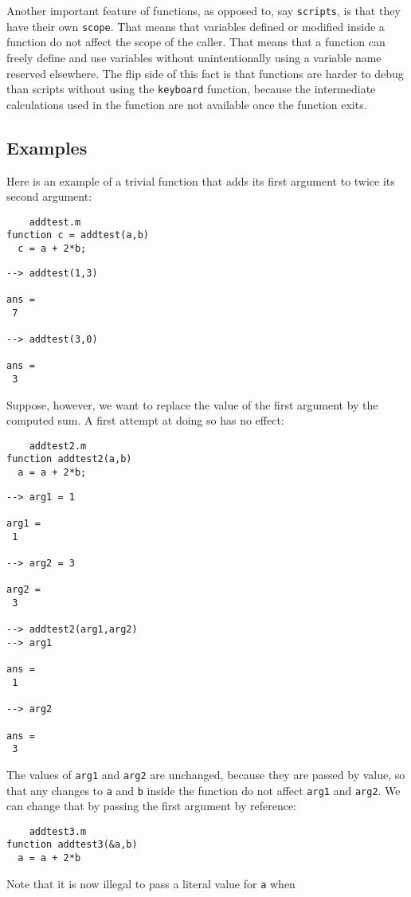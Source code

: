 Another important feature of functions, as opposed to, say \verb|scripts|,
is that they have their own \verb|scope|.  That means that variables
defined or modified inside a function do not affect the scope of the
caller.  That means that a function can freely define and use variables
without unintentionally using a variable name reserved elsewhere.  The
flip side of this fact is that functions are harder to debug than
scripts without using the \verb|keyboard| function, because the intermediate
calculations used in the function are not available once the function
exits.
\subsection{Examples}

Here is an example of a trivial function that adds its
first argument to twice its second argument:
\begin{verbatim}
    addtest.m
function c = addtest(a,b)
  c = a + 2*b;
\end{verbatim}
\begin{verbatim}
--> addtest(1,3)

ans = 
 7 

--> addtest(3,0)

ans = 
 3 
\end{verbatim}
Suppose, however, we want to replace the value of the first
argument by the computed sum.  A first attempt at doing so
has no effect:
\begin{verbatim}
    addtest2.m
function addtest2(a,b)
  a = a + 2*b;
\end{verbatim}
\begin{verbatim}
--> arg1 = 1

arg1 = 
 1 

--> arg2 = 3

arg2 = 
 3 

--> addtest2(arg1,arg2)
--> arg1

ans = 
 1 

--> arg2

ans = 
 3 
\end{verbatim}
The values of \verb|arg1| and \verb|arg2| are unchanged, because they are
passed by value, so that any changes to \verb|a| and \verb|b| inside
the function do not affect \verb|arg1| and \verb|arg2|.  We can change
that by passing the first argument by reference:
\begin{verbatim}
    addtest3.m
function addtest3(&a,b)
  a = a + 2*b
\end{verbatim}
Note that it is now illegal to pass a literal value for \verb|a| when
